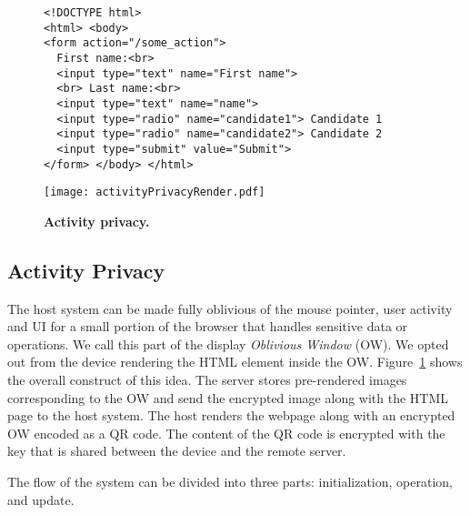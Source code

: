 \begin{figure}[t]
\small
\begin{lstlisting}[mathescape=true]
<!DOCTYPE html>
<html> <body>
<form action="/some_action">
  First name:<br>
  <input type="text" name="First name">
  <br> Last name:<br>
  <input type="text" name="name">
  <input type="radio" name="candidate1"> Candidate 1
  <input type="radio" name="candidate2"> Candidate 2
  <input type="submit" value="Submit">
</form> </body> </html>
\end{lstlisting} 
\end{figure}
\fi



\begin{figure}[h]
\centering
\texttt{[image: activityPrivacyRender.pdf]}
\caption{\textbf{Activity privacy.}}
\label{fig:activityPrivacy}
\centering
\end{figure}


\subsection{Activity Privacy}
\label{sec:systemDesign:mousePrivacy}

The host system can be made fully oblivious of the mouse pointer, user activity and UI for a small portion of the browser that handles sensitive data or operations. We call this part of the display \emph{Oblivious Window} (OW). We opted out from the device rendering the HTML element inside the OW. Figure~\ref{fig:activityPrivacy} shows the overall construct of this idea. The server stores pre-rendered images corresponding to the OW and send the encrypted image along with the HTML page to the host system. The host renders the webpage along with an encrypted OW encoded as a QR code. The content of the QR code is encrypted with the \tls key that is shared between the device and the remote server.

The flow of the system can be divided into three parts: initialization, operation, and update.


